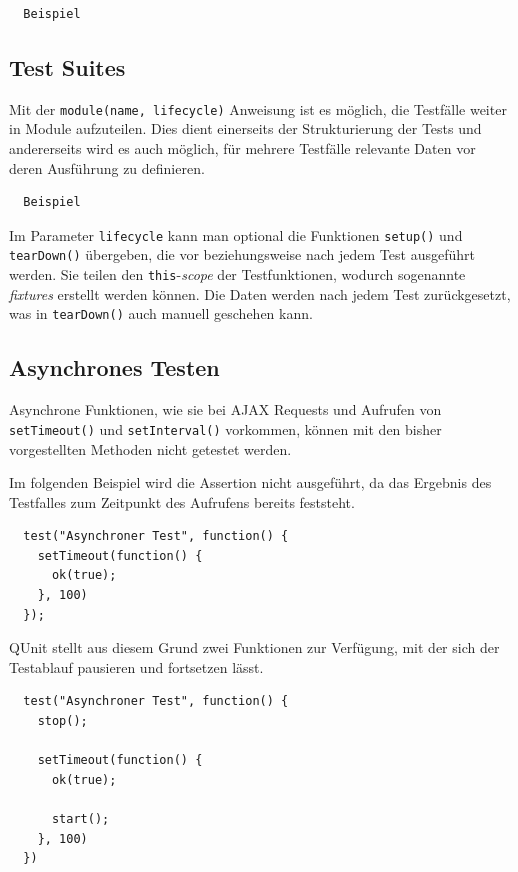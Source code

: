\documentclass[11pt, a4paper]{article}
\begin{document}
\begin{verbatim}
  Beispiel
\end{verbatim}

\subsection{Test Suites}

Mit der \texttt{module(name, lifecycle)} Anweisung ist es möglich, die Testfälle
weiter in Module aufzuteilen. Dies dient einerseits der Strukturierung der Tests
und andererseits wird es auch möglich, für mehrere Testfälle relevante Daten vor
deren Ausführung zu definieren.

\begin{verbatim}
  Beispiel
\end{verbatim}

Im Parameter \texttt{lifecycle} kann man optional die Funktionen
\texttt{setup()} und \texttt{tearDown()} übergeben, die vor beziehungsweise nach
jedem Test ausgeführt werden. Sie teilen den \texttt{this}-\emph{scope} der
Testfunktionen, wodurch sogenannte \emph{fixtures} erstellt werden können. Die
Daten werden nach jedem Test zurückgesetzt, was in \texttt{tearDown()} auch
manuell geschehen kann.

\subsection{Asynchrones Testen}

Asynchrone Funktionen, wie sie bei AJAX Requests und Aufrufen von
\texttt{setTimeout()} und \texttt{setInterval()} vorkommen, können mit den
bisher vorgestellten Methoden nicht getestet werden.

Im folgenden Beispiel\cite{huang_how_2010} wird die Assertion nicht ausgeführt, da das
Ergebnis des Testfalles zum Zeitpunkt des Aufrufens bereits feststeht.

\begin{verbatim}
  test("Asynchroner Test", function() {
    setTimeout(function() {
      ok(true);
    }, 100)
  });
\end{verbatim}

QUnit stellt aus diesem Grund zwei Funktionen zur Verfügung, mit der
sich der Testablauf pausieren und fortsetzen lässt.

\begin{verbatim}
  test("Asynchroner Test", function() {
    stop();

    setTimeout(function() {
      ok(true);

      start();
    }, 100)
  })
\end{verbatim}
\end{document}
